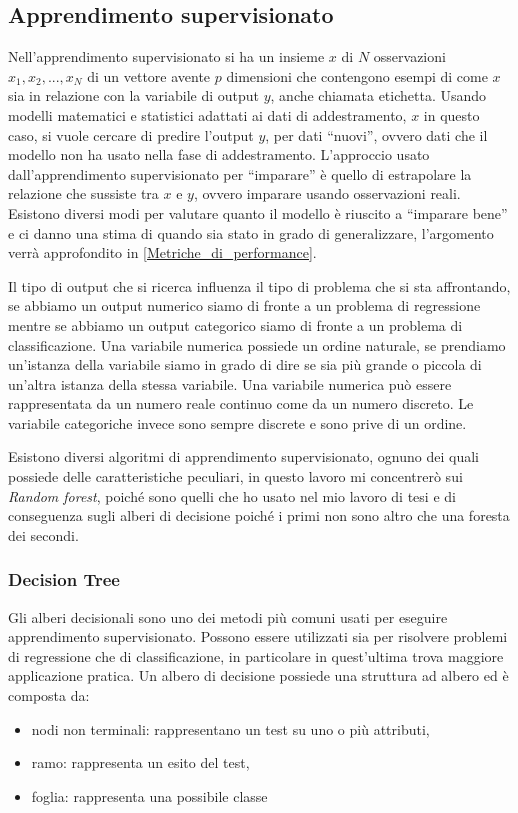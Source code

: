 \documentclass[12pt,italian]{report}
\begin{document}
	\subsection{Apprendimento supervisionato}
	Nell'apprendimento supervisionato si ha un insieme $x$ di $N$ osservazioni $x_1, x_2,...,x_N$ di un vettore avente $p$ dimensioni che contengono esempi di come $x$ sia in relazione con la variabile di output $y$, anche chiamata etichetta. Usando modelli matematici e statistici adattati ai dati di addestramento, $x$ in questo caso, si vuole cercare di predire l'output $y$, per dati ``nuovi'', ovvero dati che il modello non ha usato nella fase di addestramento.
	L'approccio usato dall'apprendimento supervisionato per ``imparare'' è quello di estrapolare la relazione che sussiste tra $x$ e $y$, ovvero imparare usando osservazioni reali.
	Esistono diversi modi per valutare quanto il modello è riuscito a ``imparare bene'' e ci danno una stima di quando sia stato in grado di generalizzare, l'argomento verrà approfondito in \ref{Metriche_di_performance}.
	
	Il tipo di output che si ricerca influenza il tipo di problema che si sta affrontando, se abbiamo un output numerico siamo di fronte a un problema di regressione mentre se abbiamo un output categorico siamo di fronte a un problema di classificazione.
	Una variabile numerica possiede un ordine naturale, se prendiamo un'istanza della variabile siamo in grado di dire se sia più grande o piccola di un'altra istanza della stessa variabile. Una variabile numerica può essere rappresentata da un numero reale continuo come da un numero discreto. Le variabile categoriche invece sono sempre discrete e sono prive di un ordine.
	
	Esistono diversi algoritmi di apprendimento supervisionato, ognuno dei quali possiede delle caratteristiche peculiari, in questo lavoro mi concentrerò sui \textit{Random forest}, poiché sono quelli che ho usato nel mio lavoro di tesi e di conseguenza sugli alberi di decisione poiché i primi non sono altro che una foresta dei secondi.
	
	\subsubsection{Decision Tree}
	Gli alberi decisionali sono uno dei metodi più comuni usati per eseguire apprendimento supervisionato. Possono essere utilizzati sia per risolvere problemi di regressione che di classificazione, in particolare in quest'ultima trova maggiore applicazione pratica. Un albero di decisione possiede una struttura ad albero ed è composta da:
	\begin{itemize}
		\item nodi non terminali: rappresentano un test su uno o più attributi,
		\item ramo: rappresenta un esito del test,
		\item foglia: rappresenta una possibile classe
	\end{itemize}
	
\end{document}
